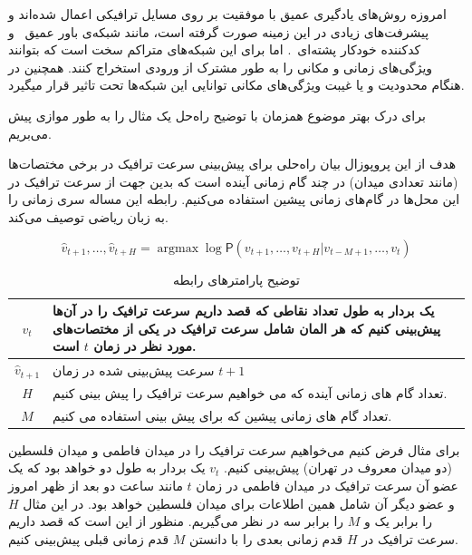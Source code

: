 \documentclass{article}
\begin{document}
امروزه روش‌های یادگیری عمیق با موفقیت بر روی مسايل ترافیکی اعمال شده‌اند و پیشرفت‌های زیادی در این زمینه صورت گرفته است،
مانند شبکه‌ی باور عمیق~ و کدکننده خودکار پشته‌ای~.
اما برای این شبکه‌های متراکم سخت است که بتوانند ویژگی‌های زمانی و مکانی را به طور مشترک از ورودی استخراج کنند.
همچنین در هنگام محدودیت و یا غیبت ویژگی‌های مکانی توانایی این شبکه‌ها تحت تاثیر قرار میگیرد.


برای درک بهتر موضوع همزمان با توضیح راه‌حل یک مثال را به طور موازی پیش می‌بریم.

هدف از این پروپوزال بیان راه‌حلی برای پیش‌بینی سرعت ترافیک در برخی مختصات‌ها (مانند تعدادی میدان) در چند گام زمانی آینده است که
بدین جهت از سرعت ترافیک در این محل‌ها در گام‌های زمانی پیشین استفاده می‌کنیم. رابطه  این مساله سری زمانی را به زبان ریاضی توصیف می‌کند.

\begin{equation}
  \label{eq:base}
  \hat{v}_{t+1}, \ldots,  \hat{v}_{t+H} = \mathop{\mathrm{argmax}} \log \mathsf{P}({v}_{t+1}, \ldots,  v_{t+H} | v_{t-M+1} , \ldots,  v_{t})
\end{equation}

\begin{table}[h]
  \centering
  \caption{توضیح پارامترهای رابطه }
  \begin{tabular}{|c|p{}|}
    \hline
    $v_{t}$ & یک بردار به طول تعداد نقاطی که قصد داریم سرعت ترافیک را در آن‌ها پیش‌بینی کنیم که هر المان شامل سرعت ترافیک در یکی از مختصات‌های مورد نظر در زمان $t$ است. \\
    \hline
    $\hat{v}_{t+1}$ & سرعت پیش‌بینی شده در زمان $t+1$ \\
    \hline
    $H$ & تعداد گام های زمانی آینده که می خواهیم سرعت ترافیک را پیش بینی کنیم. \\
    \hline
    $M$ & تعداد گام های زمانی پیشین که برای پیش بینی استفاده می کنیم. \\
    \hline
  \end{tabular}
  \label{tbl:base}
\end{table}

برای مثال فرض کنیم می‌خواهیم سرعت ترافیک را در میدان فاطمی و میدان فلسطین (دو میدان معروف در تهران) پیش‌بینی کنیم.
$v_{t}$ یک بردار به طول دو خواهد بود که یک عضو آن سرعت ترافیک در میدان فاطمی در زمان $t$ مانند ساعت دو بعد از ظهر امروز و عضو دیگر آن شامل همین اطلاعات برای میدان فلسطین خواهد بود.
در این مثال $H$ را برابر یک و $M$ را برابر سه در نظر می‌گیریم. منظور از  این است که قصد داریم سرعت ترافیک در $H$ قدم زمانی بعدی را با دانستن $M$ قدم زمانی قبلی پیش‌بینی کنیم.
\end{document}
